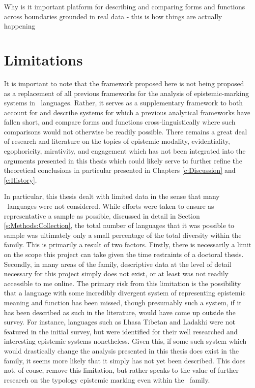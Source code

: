 Why is it important 
platform for describing and comparing forms and functions across boundaries
grounded in real data - this is how things are actually happening

\section{Limitations}
It is important to note that the framework proposed here is not being proposed as a replacement of all previous frameworks for the analysis of epistemic-marking systems in \lfam\ languages. Rather, it serves as a supplementary framework to both account for and describe systems for which a previous analytical frameworks have fallen short, and compare forms and functions cross-linguistically where such comparisons would not otherwise be readily possible. There remains a great deal of research and literature on the topics of epistemic modality, evidentiality, egophoricity, mirativity, and engagement which has not been integrated into the arguments presented in this thesis which could likely serve to further refine the theoretical conclusions in particular presented in Chapters \ref{c:Discussion} and \ref{c:History}.

In particular, this thesis dealt with limited data in the sense that many \lfam\ languages were not considered. While efforts were taken to ensure as representative a sample as possible, discussed in detail in Section \ref{s:Methods:Collection}, the total number of languages that it was possible to sample was ultimately only a small percentage of the total diversity within the family. This is primarily a result of two factors. Firstly, there is necessarily a limit on the scope this project can take given the time restraints of a doctoral thesis. Secondly, in many areas of the family, descriptive data at the level of detail necessary for this project simply does not exist, or at least was not readily accessible to me online. The primary risk from this limitation is the possibility that a language with some incredibly divergent system of representing epistemic meaning and function has been missed, though presumably such a system, if it has been described as such in the literature, would have come up outside the survey. For instance, languages such as Lhasa Tibetan and Ladakhi were not featured in the initial survey, but were identified for their well researched and interesting epistemic systems nonetheless. Given this, if some such system which would drastically change the analysis presented in this thesis does exist in the family, it seems more likely that it simply has not yet been described. This does not, of couse, remove this limitation, but rather speaks to the value of further research on the typology epistemic marking even within the \lfam\ family.

